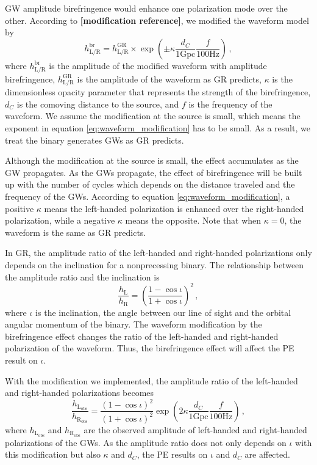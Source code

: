 \documentclass[aps,prd,twocolumn,superscriptaddress,preprintnumbers,floatfix,nofootinbib]{revtex4-2}
\begin{document}
GW amplitude birefringence would enhance one polarization mode over the other.
According to \textbf{[modification reference]}, we modified the waveform model by
\begin{equation}
    h_\mathrm{L/R}^{\mathrm{br}}=
    h_\mathrm{L/R}^{\mathrm{GR}}\times
    \exp\left(\pm\kappa\frac{d_C}{1\mathrm{Gpc}}\frac{f}{100\mathrm{Hz}}\right)\,,
    \label{eq:waveform_modification}
\end{equation}
where $h_\mathrm{L/R}^{\mathrm{br}}$ is the amplitude of the modified waveform with amplitude birefringence, $h_\mathrm{L/R}^{\mathrm{GR}}$ is the amplitude of the waveform as GR predicts, $\kappa$ is the dimensionless opacity parameter that represents the strength of the birefringence, $d_C$ is the comoving distance to the source, and $f$ is the frequency of the waveform.
We assume the modification at the source is small, which means the exponent in equation \ref{eq:waveform_modification} has to be small.
As a result, we treat the binary generates GWs as GR predicts.

Although the modification at the source is small, the effect accumulates as the GW propagates.
As the GWs propagate, the effect of birefringence will be built up with the number of cycles which depends on the distance traveled and the frequency of the GWs.
According to equation \ref{eq:waveform_modification}, a positive $\kappa$ means the left-handed polarization is enhanced over the right-handed polarization, while a negative $\kappa$ means the opposite.
Note that when $\kappa=0$, the waveform is the same as GR predicts.

In GR, the amplitude ratio of the left-handed and right-handed polarizations only depends on the inclination for a nonprecessing binary.
The relationship between the amplitude ratio and the inclination is
\begin{equation}
    \frac{h_\mathrm{L}}{h_\mathrm{R}}=\left(\frac{1-\cos\iota}{1+\cos\iota}\right)^2\,,
\end{equation}
where $\iota$ is the inclination, the angle between our line of sight and the orbital angular momentum of the binary.
The waveform modification by the birefringence effect changes the ratio of the left-handed and right-handed polarization of the waveform.
Thus, the birefringence effect will affect the PE result on $\iota$.

With the modification we implemented, the amplitude ratio of the left-handed and right-handed polarizations becomes 
\begin{equation}
    \frac{h_\mathrm{L_{obs}}}{h_\mathrm{R_{obs}}}=\frac{\left(1-\cos\iota\right)^2}{\left(1+\cos\iota\right)^2}\exp\left({2\kappa\frac{d_C}{1\mathrm{Gpc}}\frac{f}{100\mathrm{Hz}}}\right)\,,
    \label{eq:modified_amplitude_ratio}
\end{equation}
where $h_\mathrm{L_{obs}}$ and $h_\mathrm{R_{obs}}$ are the observed amplitude of left-handed and right-handed polarizations of the GWs.
As the amplitude ratio does not only depends on $\iota$ with this modification but also $\kappa$ and $d_C$, the PE results on $\iota$ and $d_C$ are affected.
\end{document}
